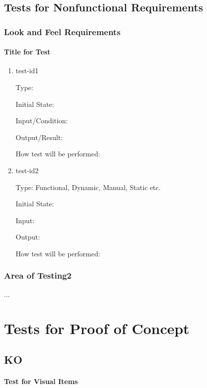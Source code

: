\documentclass[12pt, titlepage]{article}
\begin{document}
\subsection{Tests for Nonfunctional Requirements}

\subsubsection{Look and Feel Requirements}
		
\paragraph{Title for Test}

\begin{enumerate}

\item{test-id1\\}

Type: 
					
Initial State: 
					
Input/Condition: 
					
Output/Result: 
					
How test will be performed: 
					
\item{test-id2\\}

Type: Functional, Dynamic, Manual, Static etc.
					
Initial State: 
					
Input: 
					
Output: 
					
How test will be performed: 

\end{enumerate}

\subsubsection{Area of Testing2}

...

\section{Tests for Proof of Concept}

\subsection{KO}
		
\paragraph{Test for Visual Items}
\end{document}
